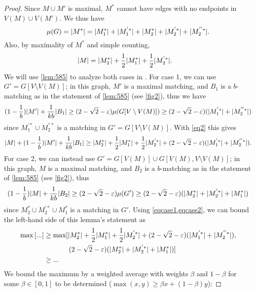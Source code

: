 \documentclass[letterpaper,11pt]{article}
\renewcommand{\epsilon}{\varepsilon}
\begin{document}
\begin{proof}
    Since $M \cup M'$ is maximal, $M^*$ cannot have edges with no endpoints in $V(M) \cup V(M')$.
    We thus have 
    \begin{equation}
        \mu(G) = |M^*| = |M_1^*| + |M_1^{'*}| + |M_2^{*}| + |M_2^{'*}| + |M_2^{''*}| . \label{eq1}
    \end{equation}
    Also, by maximality of $M^*$ and simple counting,
    \begin{align}
        |M| &= |M_2^{*}| + \frac12 |M_1^*| + \frac12 |M_2^{'*}| . \label{eq2}
    \end{align}
    We will use \cref{lem:585} to analyze both cases in .
    For case 1,
    we can use $G' = G[V \setminus V(M)]$;
    in this graph, $M'$ is a maximal matching,
    and $B_1$ is a $b$-matching as in the statement of \cref{lem:585}
    (see \cref{fig2}), thus we have
    \begin{equation*}
       (1 - \frac{1}{b}) |M'| + \frac{1}{kb} |B_1| \ge (2-\sqrt{2}-\epsilon) \mu(G[V \setminus V(M)]) \ge (2-\sqrt{2}-\epsilon) (\mop + \mtpp)
    \end{equation*}
    since $M_1^{'*} \cup M_2^{''*}$ is a matching in $G' = G[V \setminus V(M)]$.
    With \cref{eq2} this gives
    \begin{equation}
        |M| + (1 - \frac{1}{b}) |M'| + \frac{1}{kb} |B_1| \ge \mt + \frac12 \mo + \frac12 \mtp + (2-\sqrt{2}-\epsilon) (\mop + \mtpp). \label{eqcase1}
    \end{equation}
    For case 2,
    we can instead use $G' = G[V(M)] \cup G[V(M), V \setminus V(M)]$;
    in this graph, $M$ is a maximal matching,
    and $B_2$ is a $b$-matching as in the statement of \cref{lem:585}
    (see \cref{fig2}),
    thus
    \begin{equation}
        (1 - \frac{1}{b}) |M| + \frac{1}{kb} |B_2| \ge (2-\sqrt{2}-\epsilon) \mu(G') \ge  (2-\sqrt{2}-\epsilon) (\mt + \mtp + \mo) \label{eqcase2}
    \end{equation}
    since $M_2^{*} \cup M_2^{'*} \cup M_1^*$ is a matching in $G'$.
    Using \cref{eqcase1,eqcase2}, we can bound the left-hand side of this lemma's statement as
    \begin{align*}
        \max \left[...\right] &\ge \max [
        \mt + \frac12 \mo + \frac12 \mtp + (2-\sqrt{2}-\epsilon) (\mop + \mtpp), \\
        &\qquad \quad \ \; (2-\sqrt{2}-\epsilon) (\mt + \mtp + \mo)
        ] \\
        &\ge ...
    \end{align*}
    We bound the maximum by a weighted average with weights $\beta$ and $1-\beta$ for some $\beta \in [0,1]$ to be determined ($\max(x,y) \ge \beta x + (1-\beta) y$):

\end{proof}
\end{document}
